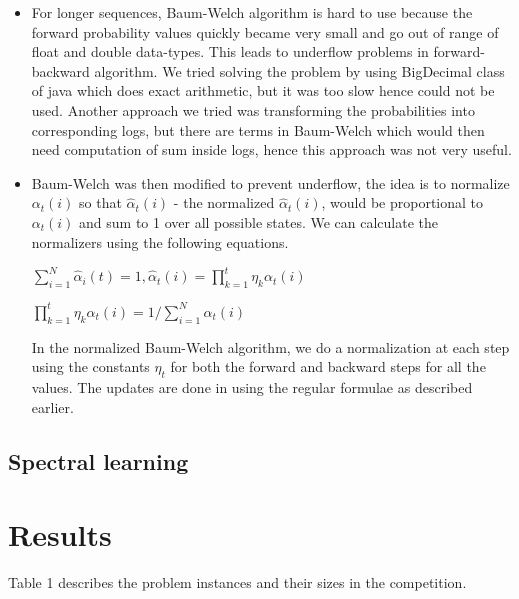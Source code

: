 \documentclass[letterpaper]{article}
\begin{document}
\begin{itemize}
\item For longer sequences, Baum-Welch algorithm is hard to use because the forward probability values quickly became very small and go out of range of float and double data-types. This leads to underflow problems in forward-backward algorithm. We tried solving the problem by using BigDecimal class of java which does exact arithmetic, but it was too slow hence could not be used. Another approach we tried was transforming the probabilities into corresponding logs, but there are terms in Baum-Welch which would then need computation of sum inside logs, hence this approach was not very useful.   

\item Baum-Welch was then modified  to prevent underflow, the idea is to normalize $\alpha_t(i)$ so that $\hat{\alpha}_{t}(i)$ - the normalized $\hat{\alpha}_{t}(i)$, would be proportional to $\alpha_{t}(i)$ and sum to 1 over all possible states. We can calculate the normalizers using the following equations. 

\begin{center}

$\sum_{i=1}^{N}\hat{\alpha}_{i}(t) = 1 , \hat{\alpha}_{t}(i) = \prod_{k=1}^t\eta_{k}\alpha_{t}(i)$ 

$\prod_{k=1}^t\eta_{k}\alpha_{t}(i) = 1/\sum_{i=1}^N\alpha_{t}(i)$

\end{center}

In the normalized Baum-Welch algorithm, we do a normalization at each step using the constants $\eta_{t}$ for both the forward and backward steps for all the values. The updates are done in using the regular formulae as described earlier.
 
\end{itemize}

\subsection{Spectral learning}



\section{Results}

Table 1 describes the problem instances and their sizes in the competition.
\end{document}
